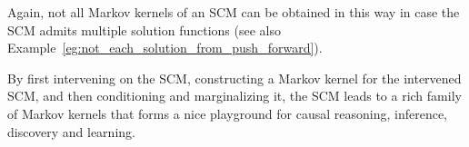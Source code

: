 Again, not all Markov kernels of an SCM can be obtained in this way in case the SCM admits multiple solution functions (see also Example~\ref{eg:not_each_solution_from_push_forward}).


By first intervening on the SCM, constructing a Markov kernel for the intervened SCM, and then conditioning and marginalizing it, the SCM leads to a rich family of Markov kernels that forms a nice playground for causal reasoning, inference, discovery and learning.
